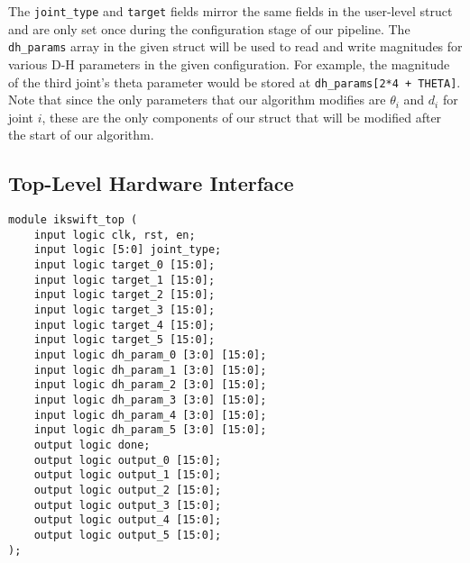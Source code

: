 The \texttt{joint\_type} and \texttt{target} fields mirror the same fields in the user-level struct and are only set once during the configuration
stage of our pipeline. The \texttt{dh\_params} array in the given struct will be used to read and write magnitudes for various D-H parameters in the 
given configuration. For example, the magnitude of the third joint's theta parameter would be stored at \texttt{dh\_params[2*4 + THETA]}. Note that
since the only parameters that our algorithm modifies are $\theta_i$ and $d_i$ for joint $i$, these are the only components of our struct that
will be modified after the start of our algorithm.

\subsection{Top-Level Hardware Interface}

\begin{verbatim}
module ikswift_top (
	input logic clk, rst, en;
	input logic [5:0] joint_type;
	input logic target_0 [15:0];
	input logic target_1 [15:0];
	input logic target_2 [15:0];
	input logic target_3 [15:0];
	input logic target_4 [15:0];
	input logic target_5 [15:0];
	input logic dh_param_0 [3:0] [15:0];
	input logic dh_param_1 [3:0] [15:0];
	input logic dh_param_2 [3:0] [15:0];
	input logic dh_param_3 [3:0] [15:0];
	input logic dh_param_4 [3:0] [15:0];
	input logic dh_param_5 [3:0] [15:0];
	output logic done;
	output logic output_0 [15:0];
	output logic output_1 [15:0];
	output logic output_2 [15:0];
	output logic output_3 [15:0];
	output logic output_4 [15:0];
	output logic output_5 [15:0];
);
\end{verbatim}
